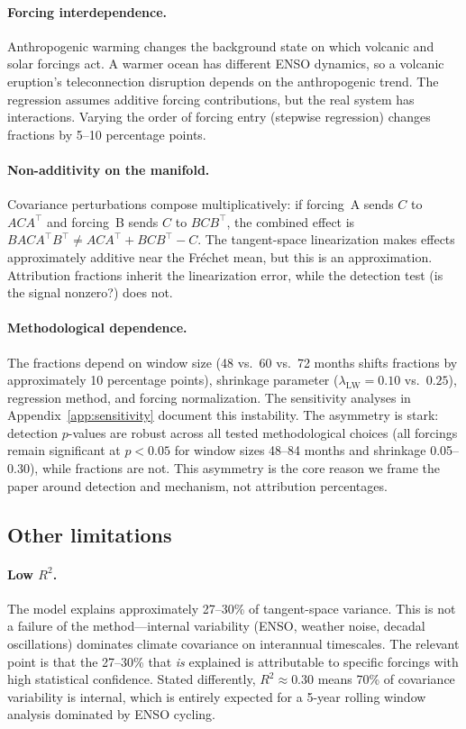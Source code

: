 \documentclass[preprint,12pt]{elsarticle}
\newcommand{\pval}{p}
\begin{document}
\paragraph{Forcing interdependence.}
Anthropogenic warming changes the background state on which volcanic and solar forcings act.
A warmer ocean has different ENSO dynamics, so a volcanic eruption's teleconnection disruption depends on the anthropogenic trend.
The regression assumes additive forcing contributions, but the real system has interactions.
Varying the order of forcing entry (stepwise regression) changes fractions by 5--10 percentage points.

\paragraph{Non-additivity on the manifold.}
Covariance perturbations compose multiplicatively: if forcing~A sends $C$ to $A C A^\top$ and forcing~B sends $C$ to $B C B^\top$, the combined effect is $B A C A^\top B^\top \neq A C A^\top + B C B^\top - C$.
The tangent-space linearization makes effects approximately additive near the Fr\'{e}chet mean, but this is an approximation.
Attribution fractions inherit the linearization error, while the detection test (is the signal nonzero?) does not.

\paragraph{Methodological dependence.}
The fractions depend on window size (48 vs.\ 60 vs.\ 72 months shifts fractions by approximately 10 percentage points), shrinkage parameter ($\lambda_\mathrm{LW} = 0.10$ vs.\ $0.25$), regression method, and forcing normalization.
The sensitivity analyses in Appendix~\ref{app:sensitivity} document this instability.
The asymmetry is stark: detection $p$-values are robust across all tested methodological choices (all forcings remain significant at $\pval < 0.05$ for window sizes 48--84 months and shrinkage 0.05--0.30), while fractions are not.
This asymmetry is the core reason we frame the paper around detection and mechanism, not attribution percentages.

\subsection{Other limitations}\label{sec:limitations}

\paragraph{Low $R^2$.}
The model explains approximately 27--30\% of tangent-space variance.
This is not a failure of the method---internal variability (ENSO, weather noise, decadal oscillations) dominates climate covariance on interannual timescales.
The relevant point is that the 27--30\% that \emph{is} explained is attributable to specific forcings with high statistical confidence.
Stated differently, $R^2 \approx 0.30$ means 70\% of covariance variability is internal, which is entirely expected for a 5-year rolling window analysis dominated by ENSO cycling.
\end{document}
